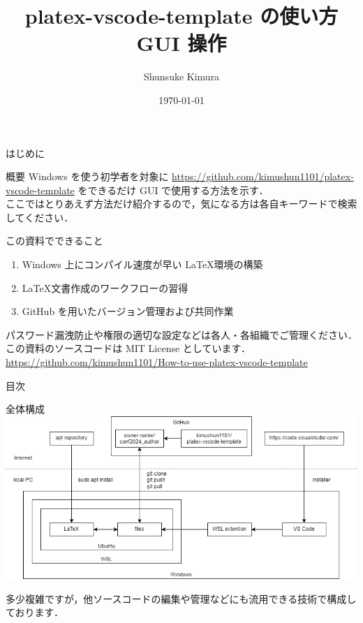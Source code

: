 \documentclass[aspectratio=169,dvipdfmx,cjk]{beamer}
\title{platex-vscode-template の使い方 \\ GUI 操作}
\author{Shunsuke Kimura}
\date{\today}
\begin{document}
\begin{frame}
  \titlepage
\end{frame}

\begin{frame}{はじめに}
  \begin{block}{概要}
    Windows を使う初学者を対象に \href{https://github.com/kimushun1101/platex-vscode-template}{https://github.com/kimushun1101/platex-vscode-template} をできるだけ GUI で使用する方法を示す．\\
    ここではとりあえず方法だけ紹介するので，気になる方は各自キーワードで検索してください．
  \end{block}
  \begin{block}{この資料でできること}
    \begin{enumerate}
      \item Windows 上にコンパイル速度が早い \LaTeX 環境の構築
      \item \LaTeX 文書作成のワークフローの習得
      \item GitHub を用いたバージョン管理および共同作業
    \end{enumerate}
  \end{block}
  \vspace*{5mm}
  \small
    パスワード漏洩防止や権限の適切な設定などは各人・各組織でご管理ください．\\
    この資料のソースコードは MIT License としています．\\
    \href{https://github.com/kimushun1101/How-to-use-platex-vscode-template}{https://github.com/kimushun1101/How-to-use-platex-vscode-template} 
\end{frame}

\begin{frame}{目次}
  \tableofcontents
\end{frame}

\begin{frame}{全体構成}
  \centering
  \includegraphics[width=0.9\linewidth]{fig/structure.png}
  \begin{tiny}
  \end{tiny}
  多少複雑ですが，他ソースコードの編集や管理などにも流用できる技術で構成しております．
\end{frame}
\end{document}
